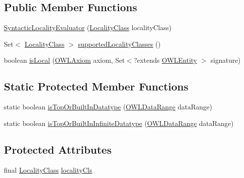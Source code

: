 \subsection*{Public Member Functions}
\begin{DoxyCompactItemize}
\item 
\hyperlink{classcom_1_1clarkparsia_1_1owlapi_1_1modularity_1_1locality_1_1_syntactic_locality_evaluator_a2fe283a3993e3efac2ec13ebb98a98f9}{Syntactic\-Locality\-Evaluator} (\hyperlink{enumcom_1_1clarkparsia_1_1owlapi_1_1modularity_1_1locality_1_1_locality_class}{Locality\-Class} locality\-Class)
\item 
Set$<$ \hyperlink{enumcom_1_1clarkparsia_1_1owlapi_1_1modularity_1_1locality_1_1_locality_class}{Locality\-Class} $>$ \hyperlink{classcom_1_1clarkparsia_1_1owlapi_1_1modularity_1_1locality_1_1_syntactic_locality_evaluator_ad3071b5a6f14ca576f6ed0549ddbe0d3}{supported\-Locality\-Classes} ()
\item 
boolean \hyperlink{classcom_1_1clarkparsia_1_1owlapi_1_1modularity_1_1locality_1_1_syntactic_locality_evaluator_ac5a5e718859ac3c8ee134dbb7e61afc6}{is\-Local} (\hyperlink{interfaceorg_1_1semanticweb_1_1owlapi_1_1model_1_1_o_w_l_axiom}{O\-W\-L\-Axiom} axiom, Set$<$?extends \hyperlink{interfaceorg_1_1semanticweb_1_1owlapi_1_1model_1_1_o_w_l_entity}{O\-W\-L\-Entity} $>$ signature)
\end{DoxyCompactItemize}
\subsection*{Static Protected Member Functions}
\begin{DoxyCompactItemize}
\item 
static boolean \hyperlink{classcom_1_1clarkparsia_1_1owlapi_1_1modularity_1_1locality_1_1_syntactic_locality_evaluator_a542db2352666f2a123a6ab9837e4960c}{is\-Top\-Or\-Built\-In\-Datatype} (\hyperlink{interfaceorg_1_1semanticweb_1_1owlapi_1_1model_1_1_o_w_l_data_range}{O\-W\-L\-Data\-Range} data\-Range)
\item 
static boolean \hyperlink{classcom_1_1clarkparsia_1_1owlapi_1_1modularity_1_1locality_1_1_syntactic_locality_evaluator_af6a305f78c4f21a3e7514e51f267fa45}{is\-Top\-Or\-Built\-In\-Infinite\-Datatype} (\hyperlink{interfaceorg_1_1semanticweb_1_1owlapi_1_1model_1_1_o_w_l_data_range}{O\-W\-L\-Data\-Range} data\-Range)
\end{DoxyCompactItemize}
\subsection*{Protected Attributes}
\begin{DoxyCompactItemize}
\item 
final \hyperlink{enumcom_1_1clarkparsia_1_1owlapi_1_1modularity_1_1locality_1_1_locality_class}{Locality\-Class} \hyperlink{classcom_1_1clarkparsia_1_1owlapi_1_1modularity_1_1locality_1_1_syntactic_locality_evaluator_a5aaace39cc33611864c9db24dc7932cb}{locality\-Cls}
\end{DoxyCompactItemize}
